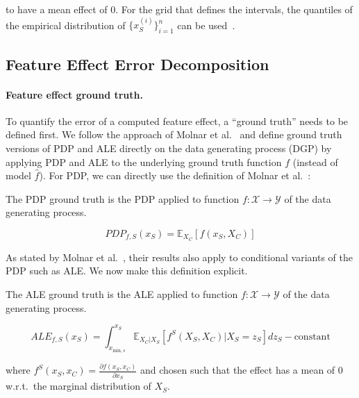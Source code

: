 \documentclass[runningheads]{llncs}
\begin{document}
\noindent to have a mean effect of $0$. For the grid that defines the intervals,
the quantiles of the empirical distribution of $\{x^{(i)}_S\}_{i=1}^n$ can be  %
used~\cite{apley_visualizing_2020}.

\subsection{Feature Effect Error Decomposition}

\paragraph{Feature effect ground truth.} To quantify the error of a computed
feature effect, a ``ground truth'' needs to
be defined first. We follow the approach of Molnar et
al.~\cite{molnar_relating_2023} and define ground truth versions of PDP and ALE
directly on the data generating process (DGP) by applying PDP and ALE to the
underlying ground truth function $f$ (instead of model $\hat f$).
For PDP, we can directly use the definition of Molnar et
al.~\cite{molnar_relating_2023}:

\begin{definition}
    The PDP ground truth is the PDP applied to function
    $f : \mathcal{X} \xrightarrow{} \mathcal{Y}$
    of the data generating process.

    \begin{equation}
        PDP_{f,S}(x_S) = \mathbb{E}_{X_C}[f(x_S,X_C)]
    \end{equation}
\end{definition}

\noindent As stated by Molnar et al.~\cite{molnar_relating_2023}, their results also
apply to conditional variants of the PDP such as ALE. We now make this  %
definition explicit.

\newpage

\begin{definition}
    The ALE ground truth is the ALE applied to function $f : \mathcal{X} \xrightarrow{} \mathcal{Y}$ of the data generating process.

    \begin{equation}
        ALE_{f,S}(x_S) = \int_{x_{\text{min},s}}^{x_S} \mathbb{E}_{X_C|X_S} \left[f^S(X_S, X_C)|X_S = z_S\right] dz_S - \text{constant}
    \end{equation}

    \noindent where $f^S(x_S, x_C) = \frac{\partial f(x_S, x_C)}{\partial x_S}$ and  chosen such that the effect has a mean of $0$ w.r.t.\ the marginal distribution of $X_S$.
\end{definition}
\end{document}
